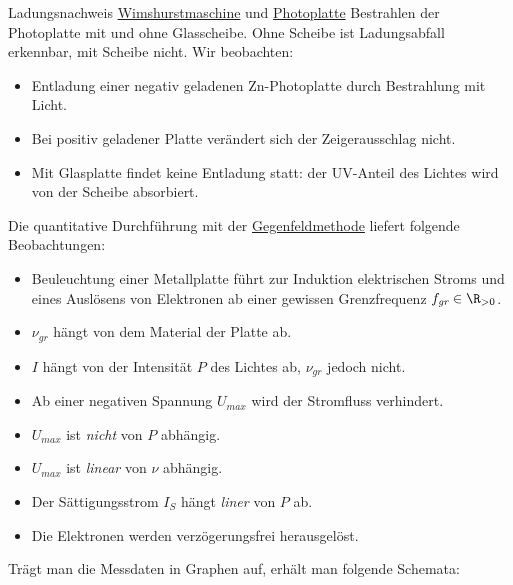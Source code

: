 \documentclass{article}
\begin{document}

    \begin{Experiment}{Ladungsnachweis \href{https://de.wikipedia.org/wiki/Wimshurstmaschine}{Wimshurstmaschine} und \href{https://de.wikipedia.org/wiki/Fotoplatte}{Photoplatte}}
        Bestrahlen der Photoplatte mit und ohne Glasscheibe. Ohne Scheibe ist Ladungsabfall erkennbar, mit Scheibe nicht. Wir beobachten:
        \begin{itemize}
            \item Entladung einer negativ geladenen Zn-Photoplatte durch Bestrahlung mit Licht.
            \item Bei positiv geladener Platte verändert sich der Zeigerausschlag nicht. 
            \item Mit Glasplatte findet keine Entladung statt: der UV-Anteil des Lichtes wird von der Scheibe absorbiert.
        \end{itemize}
        Die quantitative Durchführung mit der \href{https://www.leifiphysik.de/quantenphysik/quantenobjekt-photon/versuche/h-bestimmung-mit-der-gegenfeldmethode}{Gegenfeldmethode} liefert folgende Beobachtungen:
        \begin{itemize}
            \item Beuleuchtung einer Metallplatte führt zur Induktion elektrischen Stroms und eines Auslösens von Elektronen ab einer gewissen Grenzfrequenz $f_\textit{gr}\in\R_{>0}$. 
            \item $\nu_\textit{gr}$ hängt von dem Material der Platte ab.
            \item $I$ hängt von der Intensität $P$ des Lichtes ab, $\nu_\textit{gr}$ jedoch nicht. 
            \item Ab einer negativen Spannung $U_\textit{max}$ wird der Stromfluss verhindert.
            \item $U_\textit{max}$ ist \emph{nicht} von $P$ abhängig. 
            \item $U_\textit{max}$ ist \emph{linear} von $\nu$ abhängig.
            \item Der Sättigungsstrom $I_S$ hängt \emph{liner} von $P$ ab.
            \item Die Elektronen werden verzögerungsfrei herausgelöst. 
        \end{itemize}
        Trägt man die Messdaten in Graphen auf, erhält man folgende Schemata:
        \begin{figure}[H]
            \centering

\end{figure}
\end{Experiment}
\end{document}
